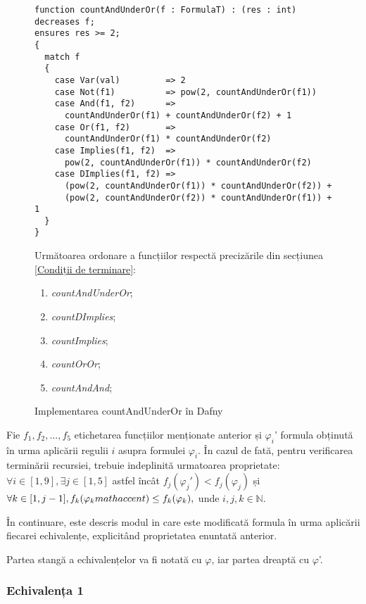 \begin{figure}[H]
\centering
\caption{Implementarea countAndUnderOr în Dafny}
\begin{Verbatim}[fontsize=\small, frame=single,baselinestretch=0.1]
function countAndUnderOr(f : FormulaT) : (res : int)
decreases f;
ensures res >= 2;
{
  match f
  {
    case Var(val)         => 2
    case Not(f1)          => pow(2, countAndUnderOr(f1))
    case And(f1, f2)      => 
      countAndUnderOr(f1) + countAndUnderOr(f2) + 1
    case Or(f1, f2)       => 
      countAndUnderOr(f1) * countAndUnderOr(f2)
    case Implies(f1, f2)  => 
      pow(2, countAndUnderOr(f1)) * countAndUnderOr(f2)
    case DImplies(f1, f2) => 
      (pow(2, countAndUnderOr(f1)) * countAndUnderOr(f2)) + 
      (pow(2, countAndUnderOr(f2)) * countAndUnderOr(f1)) + 1
  }
}
\end{Verbatim} 

Următoarea ordonare a funcțiilor respectă precizările din secțiunea \ref{Condiții de terminare}:
\begin{enumerate}
\item \textit{countAndUnderOr};
\item \textit{countDImplies};
\item \textit{countImplies};
\item \textit{countOrOr};
\item \textit{countAndAnd}; 
\end{enumerate}   

\end{figure}

Fie $f_1, f_2, ..., f_5$ etichetarea funcțiilor menționate anterior și $\varphi_i$' formula obținută în urma aplicării regulii $i$ asupra formulei $\varphi_i$. În cazul de fată, pentru verificarea terminării recursiei, trebuie indeplinită urmatoarea proprietate: $\forall i \in [1, 9], \exists j \in [1, 5]$ astfel încât $f_j(\varphi_j') < f_j(\varphi_j)$ și $\forall k \in [1,j - 1], f_k(\varphi_k\\mathaccent) \leq f_k(\varphi_k),$ unde $i, j, k \in \mathbb{N}.  $

În continuare, este descris modul in care este modificată formula în urma aplicării fiecarei echivalențe, explicitând proprietatea enuntată anterior.

\begin{remark}
Partea stangă a echivalențelor va fi notată cu $\varphi$, iar partea dreaptă cu $\varphi$'.
\end{remark} 

\subsubsection{Echivalența 1}

